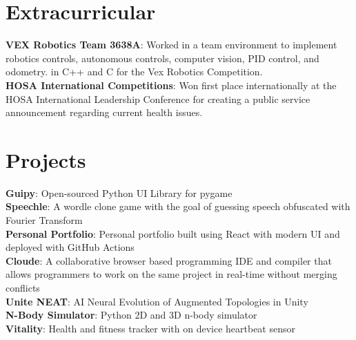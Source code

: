 \documentclass[letterpaper,10pt]{article}
\begin{document}
\section{Extracurricular}
 \begin{itemize}[leftmargin=0.15in, label={}]
    \small{\item{
     \textbf{VEX Robotics Team 3638A}{: Worked in a team environment to implement robotics controls,
autonomous controls, computer vision, PID control, and odometry.
in C++ and C for the Vex Robotics Competition.} \\
     \textbf{HOSA International Competitions}{: Won first place internationally at the HOSA International Leadership Conference for creating a public service announcement regarding current health issues.} 

    }}

 \end{itemize}
\section{Projects}
 \begin{itemize}[leftmargin=0.15in, label={}]
    \small{\item{
    \textbf{Guipy}{: Open-sourced Python UI Library for pygame} \\
    \textbf{Speechle}{: A wordle clone game with the goal of guessing speech obfuscated with Fourier Transform} \\
    \textbf{Personal Portfolio}{: Personal portfolio built using React with modern UI and deployed with GitHub Actions} \\
     \textbf{Cloude}{: A collaborative browser based programming IDE and compiler that allows programmers to work on the same project in real-time without merging conflicts} \\
     
     \textbf{Unite NEAT}{: AI Neural Evolution of Augmented Topologies in Unity \\
     \textbf{N-Body Simulator}{: Python 2D and 3D n-body simulator} \\
     \textbf{Vitality}{: Health and fitness tracker with on device heartbeat sensor} \\
    }}}

 \end{itemize}
\end{document}
